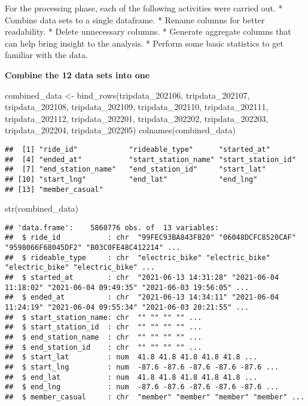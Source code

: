 \documentclass[
]{article}
\newenvironment{Shaded}{\begin{snugshade}}{\end{snugshade}}
\newcommand{\FunctionTok}[1]{\textcolor[rgb]{0.00,0.00,0.00}{#1}}
\newcommand{\NormalTok}[1]{#1}
\newcommand{\OtherTok}[1]{\textcolor[rgb]{0.56,0.35,0.01}{#1}}
\begin{document}
For the processing phase, each of the following activities were carried
out. * Combine data sets to a single dataframe. * Rename columns for
better readability. * Delete unnecessary columns. * Generate aggregate
columns that can help bring insight to the analysis. * Perform some
basic statistics to get familiar with the data.

\textbf{Combine the 12 data sets into one}

\begin{Shaded}
\begin{Highlighting}[]
\NormalTok{combined\_data }\OtherTok{\textless{}{-}} \FunctionTok{bind\_rows}\NormalTok{(tripdata\_202106, tripdata\_202107, tripdata\_202108, tripdata\_202109,}
\NormalTok{                           tripdata\_202110, tripdata\_202111, tripdata\_202112, tripdata\_202201,}
\NormalTok{                           tripdata\_202202, tripdata\_202203, tripdata\_202204, tripdata\_202205)}
\FunctionTok{colnames}\NormalTok{(combined\_data)}
\end{Highlighting}
\end{Shaded}

\begin{verbatim}
##  [1] "ride_id"            "rideable_type"      "started_at"        
##  [4] "ended_at"           "start_station_name" "start_station_id"  
##  [7] "end_station_name"   "end_station_id"     "start_lat"         
## [10] "start_lng"          "end_lat"            "end_lng"           
## [13] "member_casual"
\end{verbatim}

\begin{Shaded}
\begin{Highlighting}[]
\FunctionTok{str}\NormalTok{(combined\_data)}
\end{Highlighting}
\end{Shaded}

\begin{verbatim}
## 'data.frame':    5860776 obs. of  13 variables:
##  $ ride_id           : chr  "99FEC93BA843FB20" "06048DCFC8520CAF" "9598066F68045DF2" "B03C0FE48C412214" ...
##  $ rideable_type     : chr  "electric_bike" "electric_bike" "electric_bike" "electric_bike" ...
##  $ started_at        : chr  "2021-06-13 14:31:28" "2021-06-04 11:18:02" "2021-06-04 09:49:35" "2021-06-03 19:56:05" ...
##  $ ended_at          : chr  "2021-06-13 14:34:11" "2021-06-04 11:24:19" "2021-06-04 09:55:34" "2021-06-03 20:21:55" ...
##  $ start_station_name: chr  "" "" "" "" ...
##  $ start_station_id  : chr  "" "" "" "" ...
##  $ end_station_name  : chr  "" "" "" "" ...
##  $ end_station_id    : chr  "" "" "" "" ...
##  $ start_lat         : num  41.8 41.8 41.8 41.8 41.8 ...
##  $ start_lng         : num  -87.6 -87.6 -87.6 -87.6 -87.6 ...
##  $ end_lat           : num  41.8 41.8 41.8 41.8 41.8 ...
##  $ end_lng           : num  -87.6 -87.6 -87.6 -87.6 -87.6 ...
##  $ member_casual     : chr  "member" "member" "member" "member" ...
\end{verbatim}
\end{document}
